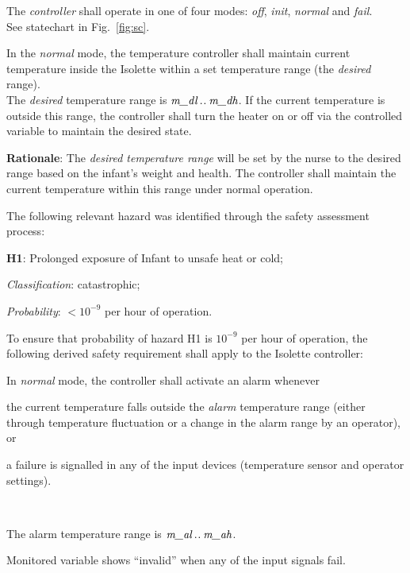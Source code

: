 \documentclass[fontsize=12pt,paper=letter,twoside]{scrartcl}
\begin{document}
\rdescription
{The \emph{controller} shall operate in one of four modes: \emph{off}, \emph{init}, \emph{normal} and \emph{fail}.\\}
{See statechart in Fig.~\ref{fig:sc}.}
\label{R1}

\rdescription
{In the \emph{normal} mode, the temperature controller shall maintain current temperature inside the Isolette within a set temperature range (the \emph{desired} range).\\}
{The \emph{desired} temperature range is $\textit{m\_dl} \mathbin{.\mkern1mu.} \textit{m\_dh}$. If the current temperature  is outside this range, the controller shall turn the heater on or off via the controlled variable  to maintain the desired state.\smallskip}
\label{R2}

\smallskip
\noindent \textbf{Rationale}: The \emph{desired temperature range} will be set by the nurse to the desired range based on the infant's weight and health. The controller shall maintain the current temperature within this range under normal operation.

The following relevant hazard was identified through the safety assessment process:
\begin{mylist}
\item \textbf{H1}: Prolonged exposure of Infant to unsafe heat or cold;
\item \emph{Classification}: catastrophic;
\item \emph{Probability}: $<10^{-9}$ per hour of operation.
\end{mylist}

\noindent To ensure that probability of hazard H1 is $10^{-9}$ per hour of operation, the following derived safety requirement shall apply to the Isolette controller: 

\rdescription
{In \emph{normal} mode, the controller shall activate an alarm whenever 

\begin{mylist}
\item the current temperature falls outside the \emph{alarm} temperature range (either through temperature fluctuation or a change in the alarm range by an operator), or
\item a failure is signalled in any of the input devices (temperature sensor and operator settings).
\end{mylist}~}
{The alarm temperature range is $\textit{m\_al}\mathbin{.\mkern1mu.}\textit{m\_ah}$.

Monitored variable  
shows ``invalid'' when any of the input signals fail.}
\label{R3}
\end{document}
